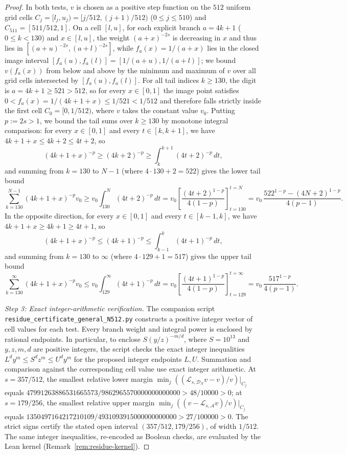 \documentclass[11pt]{article}
\theoremstyle{definition}
\theoremstyle{remark}
\begin{document}
\begin{proof}
In both tests, $v$ is chosen as a positive step function on the $512$ uniform
grid cells $C_j=[l_j,u_j)=[j/512,(j+1)/512)$ ($0\le j\le510$) and
$C_{511}=[511/512,1]$. On a cell $[l,u]$, for each explicit branch $a=4k+1$
($0\le k<130$) and $x\in[l,u]$, the weight $(a+x)^{-2s}$ is decreasing in $x$
and thus lies in $[(a+u)^{-2s},(a+l)^{-2s}]$, while $f_a(x)=1/(a+x)$ lies in the
closed image interval $[f_a(u),f_a(l)]=[1/(a+u),1/(a+l)]$; we bound $v(f_a(x))$
from below and above by the minimum and maximum of $v$ over all grid cells
intersected by $[f_a(u),f_a(l)]$. For all tail indices $k\ge130$, the digit is
$a=4k+1\ge521>512$, so for every $x\in[0,1]$ the image point satisfies
$0<f_a(x)=1/(4k+1+x)\le 1/521<1/512$ and therefore falls strictly inside the
first cell $C_0=[0,1/512)$, where $v$ takes the constant value $v_0$. Putting
$p:=2s>1$, we bound the tail sums over $k\ge130$ by monotone integral comparison:
for every $x\in[0,1]$ and every $t\in[k,k+1]$, we have
$4k+1+x\le 4k+2\le 4t+2$, so
\[
(4k+1+x)^{-p}\ge(4k+2)^{-p}\ge\int_k^{k+1}(4t+2)^{-p}\,dt,
\]
and summing from $k=130$ to $N-1$ (where $4\cdot130+2=522$) gives the lower tail
bound
\[
 \sum_{k=130}^{N-1}(4k+1+x)^{-p}v_0
 \ge v_0\int_{130}^N(4t+2)^{-p}\,dt
 =v_0\left[\frac{(4t+2)^{1-p}}{4(1-p)}\right]_{t=130}^{t=N}
 =v_0\,\frac{522^{1-p}-(4N+2)^{1-p}}{4(p-1)}.
\]
In the opposite direction, for every $x\in[0,1]$ and every $t\in[k-1,k]$, we
have $4k+1+x\ge 4k+1\ge 4t+1$, so
\[
(4k+1+x)^{-p}\le(4k+1)^{-p}\le\int_{k-1}^k(4t+1)^{-p}\,dt,
\]
and summing from $k=130$ to $\infty$ (where $4\cdot129+1=517$) gives the upper
tail bound
\[
 \sum_{k=130}^{\infty}(4k+1+x)^{-p}v_0
 \le v_0\int_{129}^\infty(4t+1)^{-p}\,dt
 =v_0\left[\frac{(4t+1)^{1-p}}{4(1-p)}\right]_{t=129}^{t=\infty}
 =v_0\,\frac{517^{1-p}}{4(p-1)} .
\]

\emph{Step 3: Exact integer-arithmetic verification.}
The companion script \texttt{residue\_\allowbreak certificate\_\allowbreak general\_\allowbreak N512.py} constructs a
positive integer vector of cell values for each test. Every branch
weight and integral power is enclosed by rational endpoints. In
particular, to enclose $S(y/z)^{-m/d}$, where $S=10^{13}$ and
$y,z,m,d$ are positive integers, the script checks the exact
integer inequalities $L^d y^m\le S^d z^m\le U^d y^m$ for the proposed
integer endpoints $L,U$. Summation and comparison against the
corresponding cell value use exact integer arithmetic. At $s=357/512$, the
smallest relative lower margin $\min_j((\mathcal L_{s,\mathcal D_N}v-v)/v)|_{C_j}$
equals
$47991263886531665573/9862965570000000000000>48/10000>0$; at $s=179/256$, the
smallest relative upper margin $\min_j((v-\mathcal L_{s,\mathcal A}v)/v)|_{C_j}$
equals
$1350497164217210109/4931093915000000000000>27/100000>0$. The
strict signs certify the stated open interval $(357/512,179/256)$, of width
$1/512$. The same integer inequalities, re-encoded as Boolean checks, are
evaluated by the Lean kernel (Remark~\ref{rem:residue-kernel}).
\end{proof}
\end{document}
